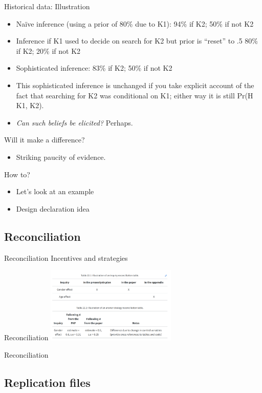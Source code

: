 \documentclass[
  11pt,
  ignorenonframetext,
]{beamer}
\providecommand{\tightlist}{%
  \setlength{\itemsep}{0pt}\setlength{\parskip}{0pt}}\usepackage{longtable,booktabs,array}
\begin{document}
\begin{frame}{Historical data: Illustration}
\protect\hypertarget{historical-data-illustration-6}{}
\begin{itemize}
\item
  Naïve inference (using a prior of 80\% due to K1): 94\% if K2; 50\% if
  not K2
\item
  Inference if K1 used to decide on search for K2 but prior is ``reset''
  to .5 80\% if K2; 20\% if not K2
\item
  Sophisticated inference: 83\% if K2; 50\% if not K2
\item
  This sophisticated inference is unchanged if you take explicit account
  of the fact that searching for K2 was conditional on K1; either way it
  is still Pr(H \textbar{} K1, K2).
\item
  \emph{Can such beliefs be elicited?} Perhaps.
\end{itemize}
\end{frame}

\begin{frame}{Will it make a difference?}
\protect\hypertarget{will-it-make-a-difference}{}
\begin{itemize}
\tightlist
\item
  Striking paucity of evidence.
\end{itemize}
\end{frame}

\begin{frame}{How to?}
\protect\hypertarget{how-to}{}
\begin{itemize}
\tightlist
\item
  Let's look at an example
\item
  Design declaration idea
\end{itemize}
\end{frame}

\hypertarget{reconciliation}{%
\subsection{Reconciliation}\label{reconciliation}}

\begin{frame}{Reconciliation}
Incentives and strategies
\end{frame}

\begin{frame}{Reconciliation}
\protect\hypertarget{reconciliation-1}{}
\includegraphics[width=2.45in,height=\textheight]{assets/reconciliation.png}
\end{frame}

\begin{frame}{Reconciliation}
\protect\hypertarget{reconciliation-2}{}
\end{frame}

\hypertarget{replication-files}{%
\subsection{Replication files}\label{replication-files}}
\end{document}
